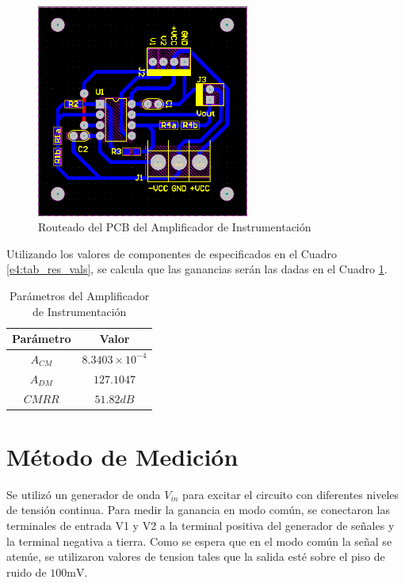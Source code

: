 \begin{figure}[!ht]
\begin{center}
\includegraphics[height=7cm]{res/altium/pcb.png}
\caption{Routeado del PCB del Amplificador de Instrumentación}
\label{e4:fig_pcb_route}
\end{center}
\end{figure}

\newpage

Utilizando los valores de componentes de especificados en el Cuadro \ref{e4:tab_res_vals}, se calcula que las ganancias serán las dadas en el Cuadro \ref{e4:tab_A}.

\begin{table}[!ht]
\begin{center}
\begin{tabular}{||c|c||}
\hline
Parámetro	&Valor	\\
\hline
$A_{CM}$	&$8.3403\times	10^{-4}$	\\
$A_{DM}$	&$127.1047$	\\
$CMRR$	&$51.82 dB$	\\
\hline
\end{tabular}
\caption{Parámetros del Amplificador de Instrumentación}
\label{e4:tab_A}
\end{center}
\end{table}

\section{Método de Medición}
Se utilizó un generador de onda $V_{in}$ para excitar el circuito con diferentes niveles de tensión continua. 
Para medir la ganancia en modo común, se conectaron las terminales de entrada V1 y V2 a la terminal positiva del generador de señales y la terminal negativa a tierra.
Como se espera que en el modo común la señal se atenúe, se utilizaron valores de tension tales que la salida esté sobre el piso de ruido de $100 \si{\milli\volt}$.


